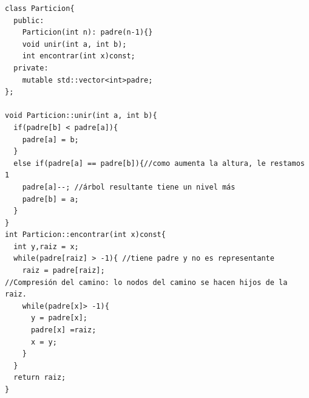 \begin{verbatim}
class Particion{
  public:
    Particion(int n): padre(n-1){}
    void unir(int a, int b);
    int encontrar(int x)const;
  private:
    mutable std::vector<int>padre;
};

void Particion::unir(int a, int b){
  if(padre[b] < padre[a]){
    padre[a] = b;
  }
  else if(padre[a] == padre[b]){//como aumenta la altura, le restamos 1
    padre[a]--; //árbol resultante tiene un nivel más
    padre[b] = a;
  }
}
int Particion::encontrar(int x)const{
  int y,raiz = x;
  while(padre[raiz] > -1){ //tiene padre y no es representante
    raiz = padre[raiz];
//Compresión del camino: lo nodos del camino se hacen hijos de la raiz.
    while(padre[x]> -1){
      y = padre[x];
      padre[x] =raiz;
      x = y;
    }
  }
  return raiz;
}
\end{verbatim}


